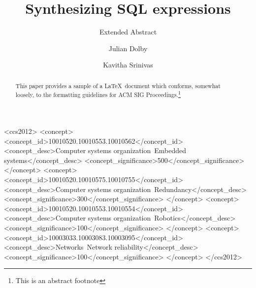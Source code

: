 \documentclass[sigconf]{acmart}
\begin{document}
\title{Synthesizing SQL expressions}
\subtitle{Extended Abstract}


\author{Julian Dolby}

\author{Kavitha Srinivas}



\begin{abstract}
This paper provides a sample of a \LaTeX\ document which conforms,
somewhat loosely, to the formatting guidelines for
ACM SIG Proceedings.\footnote{This is an abstract footnote}
\end{abstract}

%
%
\begin{CCSXML}
<ccs2012>
 <concept>
  <concept_id>10010520.10010553.10010562</concept_id>
  <concept_desc>Computer systems organization~Embedded systems</concept_desc>
  <concept_significance>500</concept_significance>
 </concept>
 <concept>
  <concept_id>10010520.10010575.10010755</concept_id>
  <concept_desc>Computer systems organization~Redundancy</concept_desc>
  <concept_significance>300</concept_significance>
 </concept>
 <concept>
  <concept_id>10010520.10010553.10010554</concept_id>
  <concept_desc>Computer systems organization~Robotics</concept_desc>
  <concept_significance>100</concept_significance>
 </concept>
 <concept>
  <concept_id>10003033.10003083.10003095</concept_id>
  <concept_desc>Networks~Network reliability</concept_desc>
  <concept_significance>100</concept_significance>
 </concept>
</ccs2012>  
\end{CCSXML}





\maketitle





 
\end{document}
